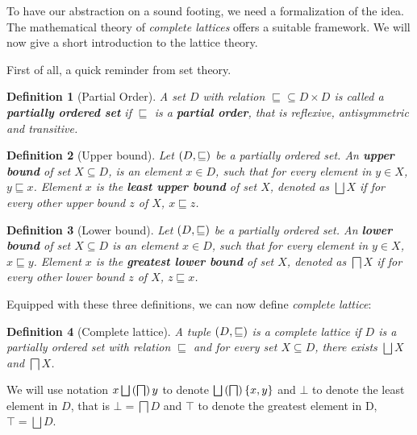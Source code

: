 \documentclass[..thesis.tex]{subfiles}
\newtheorem{defin}{Definition}[section]
\begin{document}

To have our abstraction on a sound footing, we need a formalization of the idea.
 The mathematical theory of \textit{complete lattices} offers a suitable framework.
 We will now give a short introduction to the lattice theory.


First of all, a quick reminder from set theory.

\begin{defin}[Partial Order]
A set $D$ with relation $\sqsubseteq \subseteq D \times D$ is called a \textbf{partially ordered set} if $\sqsubseteq$ 
is a \textbf{partial order}, that is reflexive, antisymmetric and transitive.
\end{defin}

\begin{defin}[Upper bound]
Let $\left( D, \sqsubseteq \right)$ be a partially ordered set. An \textbf{upper bound} of set $X \subseteq D$,  is an element $x \in D$, such that for every element in $y \in X$, $y \sqsubseteq x$. Element $x$ is the \textbf{least upper bound} of set $X$, denoted as $\bigsqcup X$ if for every other upper bound $z$ of $X$, $x \sqsubseteq z$.  
\end{defin}

\begin{defin}[Lower bound]
Let $\left( D, \sqsubseteq \right)$ be a partially ordered set. An \textbf{lower bound} of set $X \subseteq D$  is an element $x \in D$, such that for every element in $y \in X$, $x \sqsubseteq y$. Element $x$ is the \textbf{greatest lower bound} of set $X$, denoted as $\bigsqcap X$ if for every other lower bound $z$ of $X$, $z \sqsubseteq x$.    
\end{defin}

Equipped with these three definitions, we can now define \textit{complete lattice}:

\begin{defin}[Complete lattice]
A tuple $\left( D, \sqsubseteq \right)$ is a complete lattice if $D$ is a partially ordered set with relation $\sqsubseteq$ and for every set $X \subseteq D$, there exists $\bigsqcup X$ and $\bigsqcap X$.
\end{defin}


We will use notation $x \bigsqcup \lp  \bigsqcap \rp y$ to denote $\bigsqcup \lp \bigsqcap \rp \lb x, y \rb$ and $\bot$ to denote the least element in $D$, that is $\bot = \bigsqcap D$ and $\top$ to denote the greatest element in D, $\top = \bigsqcup D$.
\end{document}
